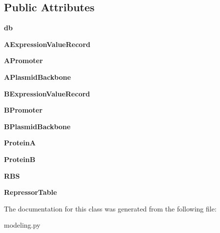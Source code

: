 \subsection*{Public Attributes}
\begin{DoxyCompactItemize}
\item 
\hypertarget{classweb_1_1modeling_1_1modeling_affbc9a007f7b35ef14afce145c58bf18}{{\bfseries db}}\label{classweb_1_1modeling_1_1modeling_affbc9a007f7b35ef14afce145c58bf18}

\item 
\hypertarget{classweb_1_1modeling_1_1modeling_a7305302d2cd99859e0641132ac9ac0f3}{{\bfseries A\-Expression\-Value\-Record}}\label{classweb_1_1modeling_1_1modeling_a7305302d2cd99859e0641132ac9ac0f3}

\item 
\hypertarget{classweb_1_1modeling_1_1modeling_a8fb8abde81146a93ee8f7e0ec8fedf7f}{{\bfseries A\-Promoter}}\label{classweb_1_1modeling_1_1modeling_a8fb8abde81146a93ee8f7e0ec8fedf7f}

\item 
\hypertarget{classweb_1_1modeling_1_1modeling_ad8689aeec5372b03c7455f53d32cc1d8}{{\bfseries A\-Plasmid\-Backbone}}\label{classweb_1_1modeling_1_1modeling_ad8689aeec5372b03c7455f53d32cc1d8}

\item 
\hypertarget{classweb_1_1modeling_1_1modeling_ab2ab0f6fc77ef28f58988fffed95fa74}{{\bfseries B\-Expression\-Value\-Record}}\label{classweb_1_1modeling_1_1modeling_ab2ab0f6fc77ef28f58988fffed95fa74}

\item 
\hypertarget{classweb_1_1modeling_1_1modeling_a96fa7c50494910911cd1bb5e0fd6c247}{{\bfseries B\-Promoter}}\label{classweb_1_1modeling_1_1modeling_a96fa7c50494910911cd1bb5e0fd6c247}

\item 
\hypertarget{classweb_1_1modeling_1_1modeling_a18419f401d8b614ce048cd4f61fe3720}{{\bfseries B\-Plasmid\-Backbone}}\label{classweb_1_1modeling_1_1modeling_a18419f401d8b614ce048cd4f61fe3720}

\item 
\hypertarget{classweb_1_1modeling_1_1modeling_a6da71e7f269b891b00412fc6897c9747}{{\bfseries Protein\-A}}\label{classweb_1_1modeling_1_1modeling_a6da71e7f269b891b00412fc6897c9747}

\item 
\hypertarget{classweb_1_1modeling_1_1modeling_aff3389950cb599a298b6370a2dad0185}{{\bfseries Protein\-B}}\label{classweb_1_1modeling_1_1modeling_aff3389950cb599a298b6370a2dad0185}

\item 
\hypertarget{classweb_1_1modeling_1_1modeling_a4cc11ff2adba839163240e9ea66ef398}{{\bfseries R\-B\-S}}\label{classweb_1_1modeling_1_1modeling_a4cc11ff2adba839163240e9ea66ef398}

\item 
\hypertarget{classweb_1_1modeling_1_1modeling_a0314c62c089feb8e1d85448cc94f7900}{{\bfseries Repressor\-Table}}\label{classweb_1_1modeling_1_1modeling_a0314c62c089feb8e1d85448cc94f7900}

\end{DoxyCompactItemize}


The documentation for this class was generated from the following file\-:\begin{DoxyCompactItemize}
\item 
modeling.\-py\end{DoxyCompactItemize}
